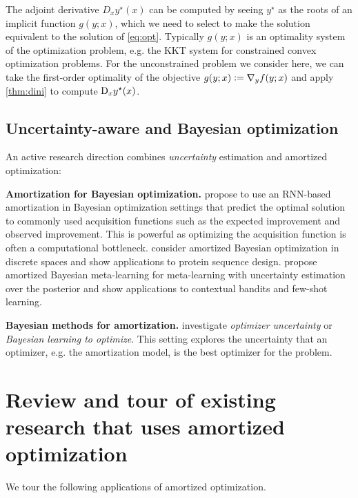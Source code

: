 \documentclass[twoside,11pt]{article}
\newcommand{\eg}{e.g.\xspace}
\begin{document}
The adjoint derivative $D_x y^\star(x)$ can be computed
by seeing $y^\star$ as the roots of an implicit
function $g(y;x)$, which we need to select to
make the solution equivalent to the solution
of \cref{eq:opt}.
Typically $g(y;x)$ is an optimality system of
the optimization problem, \eg the KKT system
for constrained convex optimization problems.
For the unconstrained problem we consider here,
we can take the first-order optimality of
the objective $g(y;x) \vcentcolon= \nabla_y f(y; x)$
and apply \cref{thm:dini} to compute
$\mathrm{D}_x y^\star(x)$.

\subsection{Uncertainty-aware and Bayesian optimization}
An active research direction combines \emph{uncertainty} estimation
and amortized optimization:

\textbf{Amortization for Bayesian optimization.}
\citet{chen2017learning} propose to use an RNN-based
  amortization in Bayesian optimization settings that
  predict the optimal solution to commonly used
  acquisition functions such as the expected improvement
  and observed improvement.
  This is powerful as optimizing the acquisition function
  is often a computational bottleneck.
\citet{swersky2020amortized} consider amortized
  Bayesian optimization in discrete spaces and show
  applications to protein sequence design.
\citet{ravi2018amortized} propose amortized
  Bayesian meta-learning for meta-learning with uncertainty
  estimation over the posterior and show applications to
  contextual bandits and few-shot learning.

\textbf{Bayesian methods for amortization.}
\citet{you2022bayesian} investigate \emph{optimizer uncertainty}
or \emph{Bayesian learning to optimize}.
This setting explores the uncertainty that an optimizer,
\eg the amortization model, is the best optimizer for
the problem.

\section{Review and tour of existing research that uses amortized optimization}
\label{sec:apps}

\begin{table}[t]
  \caption{We tour the following applications of amortized optimization.}
  \vspace{3mm}
  
  \label{tab:rw}
\end{table}
\end{document}
